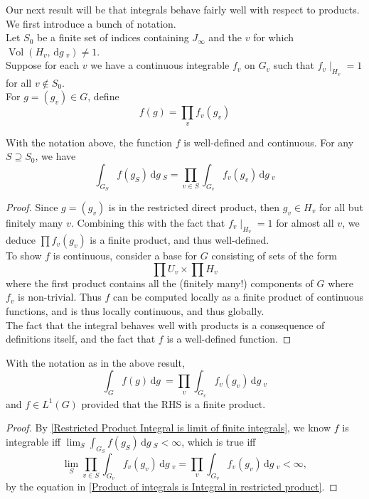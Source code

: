 \documentclass[11pt, x11names, openany]{book}
\newcommand{\dg}{\, \mathrm{d}g \ }
\DeclareMathOperator{\vol}{Vol}
\begin{document}
Our next result will be that integrals behave fairly well with respect to products. We first introduce a bunch of notation.\\
Let $S_0$ be a finite set of indices containing $J_\infty$ and the $v$ for which $\vol(H_v, \dg_v) \neq 1$.\\
Suppose for each $v$ we have a continuous integrable $f_v$ on $G_v$ such that $f_v \mid_{H_v} = 1$ for all $v \notin S_0$.\\
For $g = (g_v) \in G$, define
\begin{equation*}
    f(g) = \prod_v f_v(g_v)
\end{equation*}
\begin{prop}
\label{Product of integrals is Integral in restricted product}
With the notation above, the function $f$ is well-defined and continuous. For any $S \supseteq S_0$, we have
\begin{equation*}
    \int_{G_S}f(g_S)\dg_S = \prod_{v \in S} \int_{G_v}f_v(g_v)\dg_v
\end{equation*}
\end{prop}
\begin{proof}
Since $g = (g_v)$ is in the restricted direct product, then $g_v \in H_v$ for all but finitely many $v$. Combining this with the fact that $f_v \mid_{H_v} = 1$ for almost all $v$, we deduce $\prod f_v(g_v)$ is a finite product, and thus well-defined.\\
To show $f$ is continuous, consider a base for $G$ consisting of sets of the form
\begin{equation*}
    \prod U_v \times \prod H_v
\end{equation*}
where the first product contains all the (finitely many!) components of $G$ where $f_v$ is non-trivial. Thus $f$ can be computed locally as a finite product of continuous functions, and is thus locally continuous, and thus globally.\\
The fact that the integral behaves well with products is a consequence of definitions itself, and the fact that $f$ is a well-defined function.
\end{proof}

\begin{corollary}
\label{Product integral restricted product Corollary}
    With the notation as in the above result, 
    \begin{equation*}
        \int_G f(g) \dg = \prod_v \int_{G_v}f_v(g_v) \dg_v
    \end{equation*}
    and $f \in L^1(G)$ provided that the RHS is a finite product.
\end{corollary}
\begin{proof}
By \ref{Restricted Product Integral is limit of finite integrals}, we know $f$ is integrable iff $\lim_S \int_{G_S}f(g_S)\dg_S < \infty$, which is true iff
\begin{equation*}
    \lim_S \prod_{v \in S}\int_{G_v}f_v(g_v) \dg_v = \prod_{v} \int_{G_v}f_v(g_v) \dg_v < \infty,
\end{equation*}
by the equation in \ref{Product of integrals is Integral in restricted product}.
\end{proof}
\end{document}
